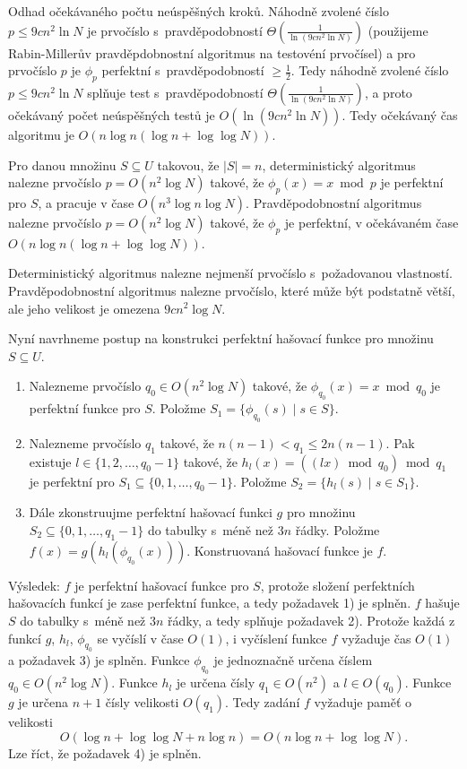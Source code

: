 \documentclass[a4paper,12pt]{article}
\begin{document}
Odhad očekávaného počtu neúspěšných kroků.\newline 
Náhodně zvolené číslo $p\le 9cn^2\ln N$ je prvočíslo s~pravděpo\-dob\-ností $\Theta (\frac 1{\ln(9cn^2\ln N)})$ 
(použi\-je\-me Rabin-Millerův pravděpdobnostní algoritmus na testovéní prvočísel) a pro prvočíslo $
p$ je $\phi_p$ 
perfektní s~prav\-dě\-po\-dob\-ností $\ge\frac 12$. Tedy náhodně zvolené 
číslo $p\le 9cn^2\ln N$ splňuje test s~pravdě\-po\-dob\-ností 
$\Theta (\frac 1{\ln(9cn^2\ln N)})$, a proto očeká\-va\-ný počet neúspěšných 
testů je $O(\ln(9cn^2\ln N))$. Tedy očeká\-vaný čas 
algoritmu je $O(n\log n(\log n+\log\log N))$.

\begin{veta}Pro danou množinu $S\subseteq U$ takovou, že 
$|S|=n$, deterministický algoritmus nalezne prvočíslo 
$p=O(n^2\log N)$ takové, že $\phi_p(x)=x\bmod p$ je perfektní 
pro $S$, a pracuje v čase $O(n^3\log n\log N)$. Pravděpodobnostní 
algoritmus nalezne pr\-vočíslo $p=O(n^2\log N)$ takové, že 
$\phi_p$ je perfektní, v očekáva\-ném čase 
$O(n\log n(\log n+\log\log N))$.
\end{veta}

Deterministický algoritmus nalezne nejmenší prvočíslo s~po\-ža\-dovanou vlastností.  Prav\-dě\-podobnostní algoritmus 
nalezne prvočíslo, které může být podstatně 
větší, ale jeho velikost je omezena $9cn^2\log N$. 

Nyní navrhneme postup na konstrukci perfektní 
hašovací funk\-ce pro množinu $S\subseteq U$.

\begin{enumerate}
\item
Nalezneme prvočíslo $q_0\in O(n^2\log N)$ takové, že 
$\phi_{q_0}(x)=x\bmod q_0$ je perfektní funkce pro $S$. Položme 
$S_1=\{\phi_{q_0}(s)\mid s\in S\}$.
\item
Nalezneme prvočíslo $q_1$ takové, že 
$n(n-1)<q_1\le 2n(n-1)$. Pak existuje 
$l\in \{1,2,\dots,q_0-1\}$ takové, že $h_l(x)=((lx)\bmod q_0
)\bmod q_1$ 
je perfektní pro $S_1\subseteq \{0,1,\dots,q_0-1\}$. Položme 
$S_2=\{h_l(s)\mid s\in S_1\}$.
\item
Dále zkonstruujme perfektní hašovací funkci 
$g$ pro množinu 
$S_2\subseteq \{0,1,\dots,q_1-1\}$ do tabulky s~méně než $
3n$ řádky. 
Položme $f(x)=g(h_l(\phi_{q_0}(x)))$. Konstruovaná hašovací 
funkce je $f$.
\end{enumerate}

Výsledek: $f$ je perfektní hašovací funkce pro $
S$, protože 
složení perfektních hašovacích funkcí je zase perfektní 
funkce, a tedy požadavek 1) je splněn. \newline 
$f$ hašuje $S$ do tabulky s~méně než $3n$ řádky, a tedy 
splňuje požadavek 2). \newline 
Protože každá z funkcí $g$, $h_l$, $\phi_{q_0}$ se vyčíslí v čase $
O(1)$, 
i vyčíslení funkce $f$ vyžaduje čas $O(1)$ a požadavek 3) je 
splněn.\newline 
Funkce $\phi_{q_0}$ je jednoznačně určena číslem $
q_0\in O(n^2\log N)$. 
Funkce $h_l$ je určena čísly $q_1\in O(n^2)$ a $l\in O(
q_0)$. Funkce $g$ 
je určena $n+1$ čísly velikosti $O(q_1)$. Tedy zadání $
f$ 
vyžaduje paměť o velikosti 
$$O(\log n+\log\log N+n\log n)=O(n\log n+\log\log N).$$
Lze říct, že požadavek 4) je splněn. 
\end{document}
